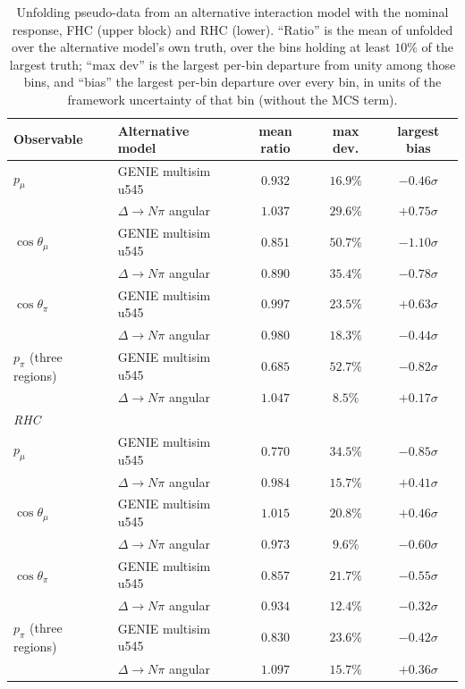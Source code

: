\documentclass[11pt,a4paper]{article}
\begin{document}
\begin{table}[H]
  \centering
  \caption{Unfolding pseudo-data from an alternative interaction model with the nominal response, FHC (upper block) and RHC (lower).
    ``Ratio'' is the mean of unfolded over the alternative model's own truth, over the bins holding at
    least $10\%$ of the largest truth; ``max dev'' is the largest per-bin departure from unity among
    those bins, and ``bias'' the largest per-bin departure over every bin, in units of the framework
    uncertainty of that bin (without the MCS term).}
  \label{tab:altmodel}
  \small
  \begin{tabular}{llccc}
    \toprule
    Observable & Alternative model & mean ratio & max dev. & largest bias \\
    \midrule
    $p_\mu$ & GENIE multisim u545 & $0.932$ & $16.9\%$ & $-0.46\sigma$ \\
            & $\Delta\to N\pi$ angular & $1.037$ & $29.6\%$ & $+0.75\sigma$ \\
    $\cos\theta_\mu$ & GENIE multisim u545 & $0.851$ & $50.7\%$ & $-1.10\sigma$ \\
                     & $\Delta\to N\pi$ angular & $0.890$ & $35.4\%$ & $-0.78\sigma$ \\
    $\cos\theta_\pi$ & GENIE multisim u545 & $0.997$ & $23.5\%$ & $+0.63\sigma$ \\
                     & $\Delta\to N\pi$ angular & $0.980$ & $18.3\%$ & $-0.44\sigma$ \\
    $p_\pi$ (three regions) & GENIE multisim u545 & $0.685$ & $52.7\%$ & $-0.82\sigma$ \\
                            & $\Delta\to N\pi$ angular & $1.047$ & $8.5\%$ & $+0.17\sigma$ \\
    \midrule
    \multicolumn{5}{l}{\emph{RHC}} \\
    $p_\mu$ & GENIE multisim u545 & $0.770$ & $34.5\%$ & $-0.85\sigma$ \\
            & $\Delta\to N\pi$ angular & $0.984$ & $15.7\%$ & $+0.41\sigma$ \\
    $\cos\theta_\mu$ & GENIE multisim u545 & $1.015$ & $20.8\%$ & $+0.46\sigma$ \\
                     & $\Delta\to N\pi$ angular & $0.973$ & $9.6\%$ & $-0.60\sigma$ \\
    $\cos\theta_\pi$ & GENIE multisim u545 & $0.857$ & $21.7\%$ & $-0.55\sigma$ \\
                     & $\Delta\to N\pi$ angular & $0.934$ & $12.4\%$ & $-0.32\sigma$ \\
    $p_\pi$ (three regions) & GENIE multisim u545 & $0.830$ & $23.6\%$ & $-0.42\sigma$ \\
                            & $\Delta\to N\pi$ angular & $1.097$ & $15.7\%$ & $+0.36\sigma$ \\
    \bottomrule
  \end{tabular}
\end{table}
\end{document}

